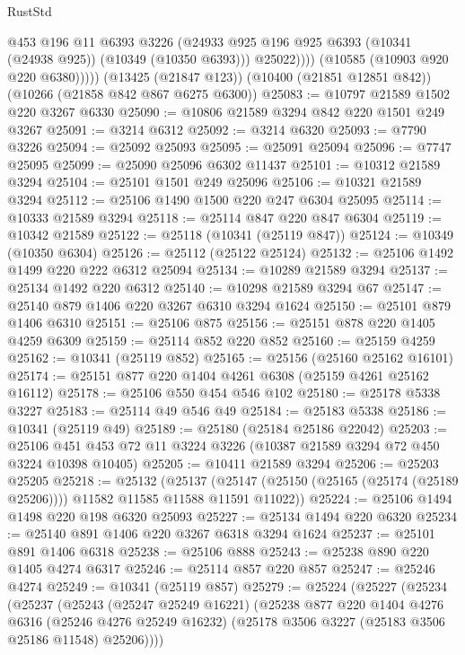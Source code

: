 \begin{lexlean}{RustStd}
\begin{coremodule}
{\begin{coremodule}
{{{{{{{{{{{{{{{{{{{{{{{{{                  @453
                  @196
                  @11
                  @6393
                  @3226
                  (@24933 @925 @196 @925 @6393 (@10341 (@24938 @925)) (@10349 (@10350 @6393)))
                  @25022))))
          (@10585 (@10903 @920 @220 @6380)))))
    (@13425 (@21847 @123))
    (@10400 (@21851 @12851 @842))
    (@10266 (@21858 @842 @867 @6275 @6300))
@25083 := @10797 @21589 @1502 @220 @3267 @6330
@25090 := @10806 @21589 @3294 @842 @220 @1501 @249 @3267
@25091 := @3214 @6312
@25092 := @3214 @6320
@25093 := @7790 @3226
@25094 := @25092 @25093
@25095 := @25091 @25094
@25096 := @7747 @25095
@25099 := @25090 @25096 @6302 @11437
@25101 := @10312 @21589 @3294
@25104 := @25101 @1501 @249 @25096
@25106 := @10321 @21589 @3294
@25112 := @25106 @1490 @1500 @220 @247 @6304 @25095
@25114 := @10333 @21589 @3294
@25118 := @25114 @847 @220 @847 @6304
@25119 := @10342 @21589
@25122 := @25118 (@10341 (@25119 @847))
@25124 := @10349 (@10350 @6304)
@25126 := @25112 (@25122 @25124)
@25132 := @25106 @1492 @1499 @220 @222 @6312 @25094
@25134 := @10289 @21589 @3294
@25137 := @25134 @1492 @220 @6312
@25140 := @10298 @21589 @3294 @67
@25147 := @25140 @879 @1406 @220 @3267 @6310 @3294 @1624
@25150 := @25101 @879 @1406 @6310
@25151 := @25106 @875
@25156 := @25151 @878 @220 @1405 @4259 @6309
@25159 := @25114 @852 @220 @852
@25160 := @25159 @4259
@25162 := @10341 (@25119 @852)
@25165 := @25156 (@25160 @25162 @16101)
@25174 := @25151 @877 @220 @1404 @4261 @6308 (@25159 @4261 @25162 @16112)
@25178 := @25106 @550 @454 @546 @102
@25180 := @25178 @5338 @3227
@25183 := @25114 @49 @546 @49
@25184 := @25183 @5338
@25186 := @10341 (@25119 @49)
@25189 := @25180 (@25184 @25186 @22042)
@25203 := @25106 @451 @453 @72 @11 @3224 @3226 (@10387 @21589 @3294 @72 @450 @3224 @10398 @10405)
@25205 := @10411 @21589 @3294
@25206 := @25203 @25205
@25218 := @25132
    (@25137 (@25147 (@25150 (@25165 (@25174 (@25189 @25206)))) @11582 @11585 @11588 @11591 @11022))
@25224 := @25106 @1494 @1498 @220 @198 @6320 @25093
@25227 := @25134 @1494 @220 @6320
@25234 := @25140 @891 @1406 @220 @3267 @6318 @3294 @1624
@25237 := @25101 @891 @1406 @6318
@25238 := @25106 @888
@25243 := @25238 @890 @220 @1405 @4274 @6317
@25246 := @25114 @857 @220 @857
@25247 := @25246 @4274
@25249 := @10341 (@25119 @857)
@25279 := @25224
    (@25227
      (@25234
        (@25237
          (@25243
            (@25247 @25249 @16221)
            (@25238
              @877
              @220
              @1404
              @4276
              @6316
              (@25246 @4276 @25249 @16232)
              (@25178 @3506 @3227 (@25183 @3506 @25186 @11548) @25206))))
}}}}}}}}}}}}}}}}}}}}}}}}}
\end{coremodule}}
\end{coremodule}
\end{lexlean}
